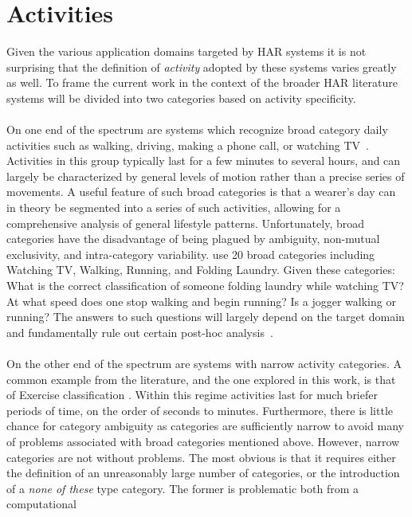 \documentclass[12pt]{report}
\newcommand{\1}[0]{\mathbbm{1}}
\begin{document}
\section{Activities}
\label{sec:HAR-Activities}
Given the various application domains targeted by \ac{HAR} systems it is not surprising
that the definition of \emph{activity} adopted by these systems varies greatly as well.
To frame the current work in the context of the broader \ac{HAR} literature systems will
be divided into two categories based on activity specificity.
\\\\
On one end of the spectrum are systems which recognize broad category daily activities
such as walking, driving, making a phone call, or watching TV~\cite{multiple-sensor-bao}.
Activities in this group typically last for a few minutes to several hours,
and can largely be characterized by general levels of motion rather than a precise
series of movements. A useful feature of such broad categories is that a wearer's day
can in theory be segmented into a series of such activities, allowing for a comprehensive
analysis of general lifestyle patterns. Unfortunately, broad categories have the disadvantage
of being plagued by ambiguity, non-mutual exclusivity, and intra-category variability.
\cite{multiple-sensor-bao} use 20 broad categories including Watching TV, Walking,
Running, and Folding Laundry. Given these categories: What is the correct classification of
someone folding laundry while watching TV? At what speed does one stop walking and begin running?
Is a jogger walking or running? The answers to such questions will largely depend on the target
domain and fundamentally rule out certain post-hoc analysis~\cite{ms-overview}.
\\\\
On the other end of the spectrum are systems with narrow activity categories.
A common example from the literature, and the one explored in this work,
is that of Exercise classification \cite{ms-activity}. Within this regime activities
last for much briefer periods of time, on the order of seconds to minutes. Furthermore,
there is little chance for category ambiguity as categories are sufficiently narrow
to avoid many of problems associated with broad categories mentioned above. However,
narrow categories are not without problems. The most obvious is that it requires either
the definition of an unreasonably large number of categories, or the introduction of a
\emph{none of these} type category. The former is problematic both from a computational
\end{document}
